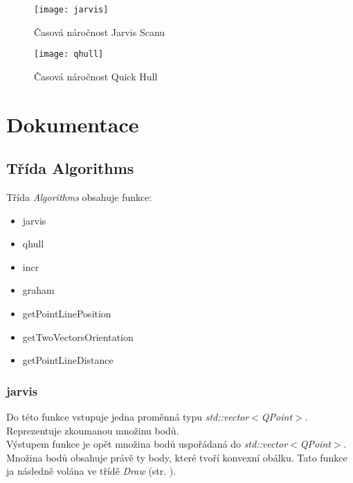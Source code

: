 \documentclass{article}
\begin{document}
\begin{figure}[htbp]
\begin{center}
\texttt{[image: jarvis]} %
 \caption{Časová náročnost Jarvis Scanu}
\end{center}
%
\begin{center}
\texttt{[image: qhull]} %
 \caption{Časová náročnost Quick Hull}
\end{center}
\end{figure}



\newpage
\section{Dokumentace \label{sec:alg}}
\subsection{Třída Algorithms}
Třída \emph{Algorithms} obsahuje funkce:
\begin{itemize}
\item jarvis
\item qhull
\item incr
\item graham
\item getPointLinePosition
\item getTwoVectorsOrientation
\item getPointLineDistance
\end{itemize}

\subsubsection{jarvis}
Do této funkce vstupuje jedna proměnná typu  \emph{std::vector$<$QPoint$>$}. Reprezentuje zkoumanou množinu bodů.\\
Výstupem funkce je opět množina bodů uspořádaná do \emph{std::vector$<$QPoint$>$}. Množina bodů obsahuje právě ty body, které tvoří konvexní obálku. Tato funkce ja následně volána ve třídě \emph{Draw} (str. \pageref{sec:draw}).
\end{document}
